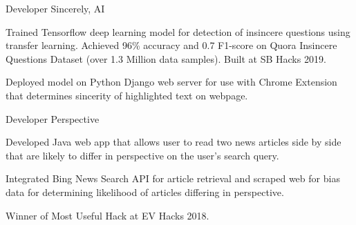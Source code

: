 

\begin{cventries}

  \cventry
    {Developer} %
    {Sincerely, AI} %
    {} %
    {} %
    {
      \begin{cvitems} %
        \item {Trained Tensorflow deep learning model for detection of insincere questions using 
        transfer learning. Achieved 96\% accuracy and 0.7 F1-score on Quora Insincere 
        Questions Dataset (over 1.3 Million data samples). Built at SB Hacks 2019.}
        \item {Deployed model on Python Django web server for use with Chrome Extension that determines
        sincerity of highlighted text on webpage.}
      \end{cvitems}
    }

  \cventry
    {Developer} %
    {Perspective} %
    {} %
    {} %
    {
      \begin{cvitems} %
        \item {Developed Java web app that allows user to read two news articles side by side 
        that are likely to differ in perspective on the user's search query. }
        \item{Integrated Bing News Search API for article retrieval and scraped web for bias data for determining likelihood of articles differing in perspective.}
        \item {Winner of Most Useful Hack at EV Hacks 2018.}
      \end{cvitems}
    }

\end{cventries}
